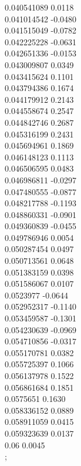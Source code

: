 {        0.040541089	0.0118\\
        0.041014542	-0.0480\\
        0.041515049	-0.0782\\
        0.042225228	-0.0631\\
        0.042651336	-0.0153\\
        0.043009807	0.0349\\
        0.043415624	0.1101\\
        0.043794386	0.1674\\
        0.044179912	0.2143\\
        0.044558674	0.2547\\
        0.044842746	0.2687\\
        0.045316199	0.2431\\
        0.045694961	0.1869\\
        0.046148123	0.1113\\
        0.046506595	0.0483\\
        0.046986811	-0.0297\\
        0.047480555	-0.0877\\
        0.048217788	-0.1193\\
        0.048860331	-0.0901\\
        0.049360839	-0.0455\\
        0.049786946	0.0054\\
        0.050287454	0.0497\\
        0.050713561	0.0648\\
        0.051383159	0.0398\\
        0.051586067	0.0107\\
        0.0523977	-0.0644\\
        0.052952317	-0.1140\\
        0.053459587	-0.1301\\
        0.054230639	-0.0969\\
        0.054710856	-0.0317\\
        0.055170781	0.0382\\
        0.055725397	0.1066\\
        0.056137978	0.1522\\
        0.056861684	0.1851\\
        0.0575651	0.1630\\
        0.058336152	0.0889\\
        0.058911059	0.0415\\
        0.059323639	0.0137\\
        0.06	0.0045\\
        };
